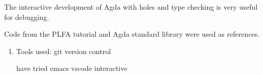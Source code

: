 \documentclass[12pt,twoside,a4paper]{report}
\theoremstyle{definition}
\begin{document}
    The interactive development of Agda with holes and type checking is very useful for debugging. 

    Code from the PLFA tutorial and Agda standard library \cite{agda_std} were used as references. 

    \begin{enumerate}
        \item 
            Tools used:
            git version control

            have tried emacs
            vscode interactive 
    \end{enumerate}



    \printbibliography
\end{document}
